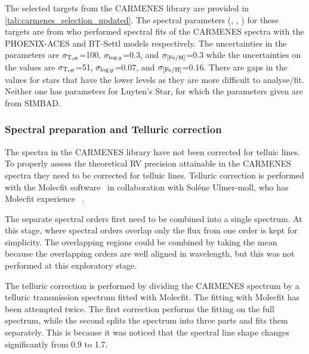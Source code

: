 The selected targets from the {CARMENES} library are provided in \cref{tab:carmenes_selection_updated}.
The spectral parameters (\Teff{}, \Logg{}, \feh{}) for these targets are from \citet{passegger_carmenes_2018, rajpurohit_exploring_2018} who performed spectral fits of the {CARMENES} spectra with the {PHOENIX-ACES} and {BT-Settl} models respectively.
The uncertainties in the \citet{rajpurohit_exploring_2018} parameters are \(\sigma_{\textrm{T}_{\mathrm{eff}}{}}\)=100\K{}, \(\sigma_{\log{g}{}}\)=0.3, and \(\sigma_{\feh{}}\)=0.3 while the uncertainties on the 
\citet{passegger_carmenes_2018} values are \(\sigma_{\textrm{T}_{\mathrm{eff}}{}}\)=51\K{}, \(\sigma_{\log{g}{}}\)=0.07, and \(\sigma_{\feh{}}\)=0.16.
There are gaps in the \citet{passegger_carmenes_2018} values for stars that have the lower \snr{} levels as they are more difficult to analyse/fit.
Neither one has parameters for Luyten's Star, for which the parameters given are from {SIMBAD}.

\begin{landscape}
    
\end{landscape}


\subsubsection{Spectral preparation and Telluric correction}
\label{subsec:prepatation_on_carmenes}
The spectra in the  {CARMENES} library have not been corrected for telluic lines.
To properly assess the theoretical {RV} precision attainable in the {CARMENES} spectra they need to be corrected for telluic lines.
Telluric correction is performed with the {Molecfit} software~\citep{smette_molecfit_2015} in collaboration with Sol\'ene Ulmer-moll, who has {Molecfit} experience ~\citet{ulmer-moll_telluric_2018}.

The separate spectral orders first need to be combined into a single spectrum.
At this stage, where spectral orders overlap only the flux from one order is kept for simplicity.
The overlapping regions could be combined by taking the mean because the overlapping orders are well aligned in wavelength, but this was not performed at this exploratory stage.

The telluric correction is performed by dividing the {CARMENES} spectrum by a telluric transmission spectrum fitted with {Molecfit}.
The fitting with {Molecfit} has been attempted twice.
The first correction performs the fitting on the full \nir{} spectrum, while the second splits the spectrum into three parts and fits them separately.
This is because it was noticed that the spectral line shape changes significantly from 0.9\um{} to 1.7\um{}.

